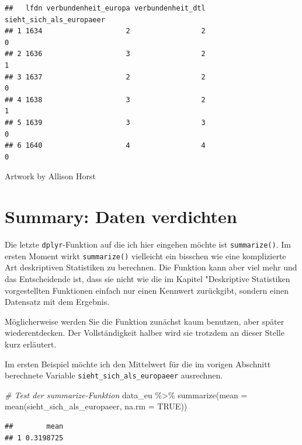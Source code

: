 \documentclass[
]{book}
\newenvironment{Shaded}{\begin{snugshade}}{\end{snugshade}}
\newcommand{\AttributeTok}[1]{\textcolor[rgb]{0.77,0.63,0.00}{#1}}
\newcommand{\CommentTok}[1]{\textcolor[rgb]{0.56,0.35,0.01}{\textit{#1}}}
\newcommand{\ConstantTok}[1]{\textcolor[rgb]{0.00,0.00,0.00}{#1}}
\newcommand{\FunctionTok}[1]{\textcolor[rgb]{0.00,0.00,0.00}{#1}}
\newcommand{\NormalTok}[1]{#1}
\newcommand{\SpecialCharTok}[1]{\textcolor[rgb]{0.00,0.00,0.00}{#1}}
\begin{document}
\begin{verbatim}
##   lfdn verbundenheit_europa verbundenheit_dtl sieht_sich_als_europaeer
## 1 1634                    2                 2                        0
## 2 1636                    3                 2                        1
## 3 1637                    2                 2                        0
## 4 1638                    3                 2                        1
## 5 1639                    3                 3                        0
## 6 1640                    4                 4                        0
\end{verbatim}

Artwork by Allison Horst

\hypertarget{summary-daten-verdichten}{%
\section{Summary: Daten verdichten}\label{summary-daten-verdichten}}

Die letzte \texttt{dplyr}-Funktion auf die ich hier eingehen möchte ist \texttt{summarize()}. Im ersten Moment wirkt \texttt{summarize()} vielleicht ein bisschen wie eine komplizierte Art deskriptiven Statistiken zu berechnen. Die Funktion kann aber viel mehr und das Entscheidende ist, dass sie nicht wie die im Kapitel "Deskriptive Statistiken vorgestellten Funktionen einfach nur einen Kennwert zurückgibt, sondern einen Datensatz mit dem Ergebnis.

Möglicherweise werden Sie die Funktion zunächst kaum benutzen, aber später wiederentdecken. Der Vollständigkeit halber wird sie trotzdem an dieser Stelle kurz erläutert.

Im ersten Beispiel möchte ich den Mittelwert für die im vorigen Abschnitt berechnete Variable \texttt{sieht\_sich\_als\_europaeer} ausrechnen.

\begin{Shaded}
\begin{Highlighting}[]
\CommentTok{\# Test der summarize{-}Funktion}
\NormalTok{data\_eu }\SpecialCharTok{\%\textgreater{}\%} 
  \FunctionTok{summarize}\NormalTok{(}\AttributeTok{mean =} \FunctionTok{mean}\NormalTok{(sieht\_sich\_als\_europaeer, }\AttributeTok{na.rm =} \ConstantTok{TRUE}\NormalTok{))}
\end{Highlighting}
\end{Shaded}

\begin{verbatim}
##        mean
## 1 0.3198725
\end{verbatim}
\end{document}
